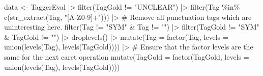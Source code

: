 \documentclass[
  letterpaper,
  DIV=11,
  numbers=noendperiod]{scrreprt}
\newenvironment{Shaded}{\begin{snugshade}}{\end{snugshade}}
\newcommand{\AttributeTok}[1]{\textcolor[rgb]{0.40,0.45,0.13}{#1}}
\newcommand{\CommentTok}[1]{\textcolor[rgb]{0.37,0.37,0.37}{#1}}
\newcommand{\FunctionTok}[1]{\textcolor[rgb]{0.28,0.35,0.67}{#1}}
\newcommand{\NormalTok}[1]{\textcolor[rgb]{0.00,0.23,0.31}{#1}}
\newcommand{\OtherTok}[1]{\textcolor[rgb]{0.00,0.23,0.31}{#1}}
\newcommand{\SpecialCharTok}[1]{\textcolor[rgb]{0.37,0.37,0.37}{#1}}
\newcommand{\StringTok}[1]{\textcolor[rgb]{0.13,0.47,0.30}{#1}}
\begin{document}
\begin{Shaded}
\begin{Highlighting}[]
\NormalTok{data }\OtherTok{\textless{}{-}}\NormalTok{ TaggerEval }\SpecialCharTok{|\textgreater{}} 
  \FunctionTok{filter}\NormalTok{(TagGold }\SpecialCharTok{!=} \StringTok{"UNCLEAR"}\NormalTok{) }\SpecialCharTok{|\textgreater{}} 
  \FunctionTok{filter}\NormalTok{(Tag }\SpecialCharTok{\%in\%} \FunctionTok{c}\NormalTok{(}\FunctionTok{str\_extract}\NormalTok{(Tag, }\StringTok{"[A{-}Z0{-}9]+"}\NormalTok{))) }\SpecialCharTok{|\textgreater{}} \CommentTok{\# Remove all punctuation tags which are uninteresting here.}
  \FunctionTok{filter}\NormalTok{(Tag }\SpecialCharTok{!=} \StringTok{"SYM"} \SpecialCharTok{\&}\NormalTok{ Tag }\SpecialCharTok{!=} \StringTok{"\textasciigrave{}\textasciigrave{}"}\NormalTok{) }\SpecialCharTok{|\textgreater{}} 
  \FunctionTok{filter}\NormalTok{(TagGold }\SpecialCharTok{!=} \StringTok{"SYM"} \SpecialCharTok{\&}\NormalTok{ TagGold }\SpecialCharTok{!=} \StringTok{"\textasciigrave{}\textasciigrave{}"}\NormalTok{) }\SpecialCharTok{|\textgreater{}} 
  \FunctionTok{droplevels}\NormalTok{() }\SpecialCharTok{|\textgreater{}} 
  \FunctionTok{mutate}\NormalTok{(}\AttributeTok{Tag =} \FunctionTok{factor}\NormalTok{(Tag, }\AttributeTok{levels =} \FunctionTok{union}\NormalTok{(}\FunctionTok{levels}\NormalTok{(Tag), }\FunctionTok{levels}\NormalTok{(TagGold)))) }\SpecialCharTok{|\textgreater{}} \CommentTok{\# Ensure that the factor levels are the same for the next caret operation}
  \FunctionTok{mutate}\NormalTok{(}\AttributeTok{TagGold =} \FunctionTok{factor}\NormalTok{(TagGold, }\AttributeTok{levels =} \FunctionTok{union}\NormalTok{(}\FunctionTok{levels}\NormalTok{(Tag), }\FunctionTok{levels}\NormalTok{(TagGold))))}


\end{Highlighting}
\end{Shaded}
\end{document}
